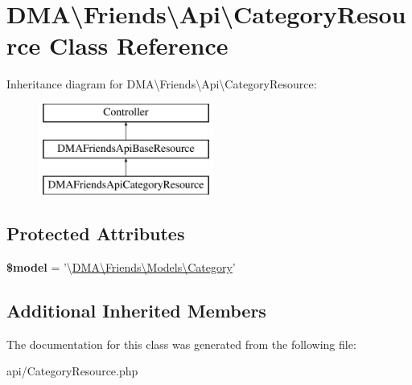 \hypertarget{classDMA_1_1Friends_1_1Api_1_1CategoryResource}{\section{D\+M\+A\textbackslash{}Friends\textbackslash{}Api\textbackslash{}Category\+Resource Class Reference}
\label{classDMA_1_1Friends_1_1Api_1_1CategoryResource}
}
Inheritance diagram for D\+M\+A\textbackslash{}Friends\textbackslash{}Api\textbackslash{}Category\+Resource\+:\begin{figure}[H]
\begin{center}
\leavevmode
\includegraphics[height=3.000000cm]{d6/d3b/classDMA_1_1Friends_1_1Api_1_1CategoryResource}
\end{center}
\end{figure}
\subsection*{Protected Attributes}
\begin{DoxyCompactItemize}
\item 
\hypertarget{classDMA_1_1Friends_1_1Api_1_1CategoryResource_ab6d62dffa329fabcda1eda6bc9e8a52e}{{\bfseries \$model} = '\textbackslash{}\hyperlink{classDMA_1_1Friends_1_1Models_1_1Category}{D\+M\+A\textbackslash{}\+Friends\textbackslash{}\+Models\textbackslash{}\+Category}'}\label{classDMA_1_1Friends_1_1Api_1_1CategoryResource_ab6d62dffa329fabcda1eda6bc9e8a52e}

\end{DoxyCompactItemize}
\subsection*{Additional Inherited Members}


The documentation for this class was generated from the following file\+:\begin{DoxyCompactItemize}
\item 
api/Category\+Resource.\+php\end{DoxyCompactItemize}
